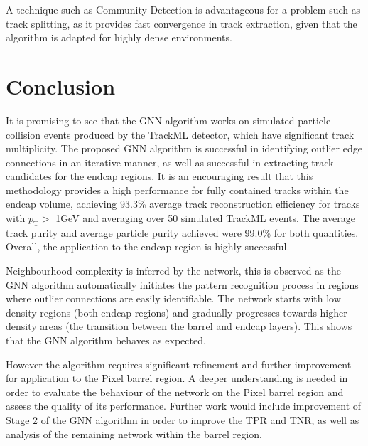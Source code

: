 A technique such as Community Detection is advantageous for a problem such as track splitting, as it provides fast convergence in track extraction, given that the algorithm is adapted for highly dense environments.





\section{Conclusion}

It is promising to see that the GNN algorithm works on simulated particle collision events produced by the TrackML detector, which have significant track multiplicity. The proposed GNN algorithm is successful in identifying outlier edge connections in an iterative manner, as well as successful in extracting track candidates for the endcap regions. It is an encouraging result that this methodology provides a high performance for fully contained tracks within the endcap volume, achieving 93.3\% average track reconstruction efficiency for tracks with $p_{\text{T}} >$ 1GeV and averaging over 50 simulated TrackML events. The average track purity and average particle purity achieved were 99.0\% for both quantities. Overall, the application to the endcap region is highly successful.

Neighbourhood complexity is inferred by the network, this is observed as the GNN algorithm automatically initiates the pattern recognition process in regions where outlier connections are easily identifiable. The network starts with low density regions (both endcap regions) and gradually progresses towards higher density areas (the transition between the barrel and endcap layers). This shows that the GNN algorithm behaves as expected.

However the algorithm requires significant refinement and further improvement for application to the Pixel barrel region. A deeper understanding is needed in order to evaluate the behaviour of the network on the Pixel barrel region and assess the quality of its performance. Further work would include improvement of Stage 2 of the GNN algorithm in order to improve the TPR and TNR, as well as analysis of the remaining network within the barrel region.
